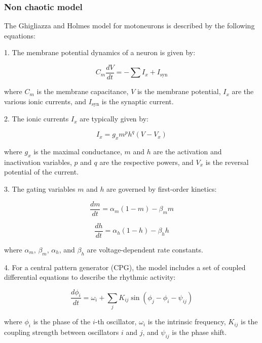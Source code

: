 \subsubsection{Non chaotic model \cite{ghigliazza_minimal_2004}}
The Ghigliazza and Holmes model for motoneurons is described by the following equations:

1. The membrane potential dynamics of a neuron is given by:

\begin{equation}
	C_m \frac{dV}{dt} = -\sum I_x + I_{\text{syn}}
\end{equation}

where \( C_m \) is the membrane capacitance, \( V \) is the membrane potential, \( I_x \) are the various ionic currents, and \( I_{\text{syn}} \) is the synaptic current.

2. The ionic currents \( I_x \) are typically given by:

\begin{equation}
	I_x = g_x m^p h^q (V - V_x)
\end{equation}

where \( g_x \) is the maximal conductance, \( m \) and \( h \) are the activation and inactivation variables, \( p \) and \( q \) are the respective powers, and \( V_x \) is the reversal potential of the current.

3. The gating variables \( m \) and \( h \) are governed by first-order kinetics:

\begin{equation}
	\frac{dm}{dt} = \alpha_m (1 - m) - \beta_m m
\end{equation}

\begin{equation}
	\frac{dh}{dt} = \alpha_h (1 - h) - \beta_h h
\end{equation}

where \( \alpha_m \), \( \beta_m \), \( \alpha_h \), and \( \beta_h \) are voltage-dependent rate constants.

4. For a central pattern generator (CPG), the model includes a set of coupled differential equations to describe the rhythmic activity:

\begin{equation}
	\frac{d\phi_i}{dt} = \omega_i + \sum_j K_{ij} \sin(\phi_j - \phi_i - \psi_{ij})
\end{equation}

where \( \phi_i \) is the phase of the \( i \)-th oscillator, \( \omega_i \) is the intrinsic frequency, \( K_{ij} \) is the coupling strength between oscillators \( i \) and \( j \), and \( \psi_{ij} \) is the phase shift.



